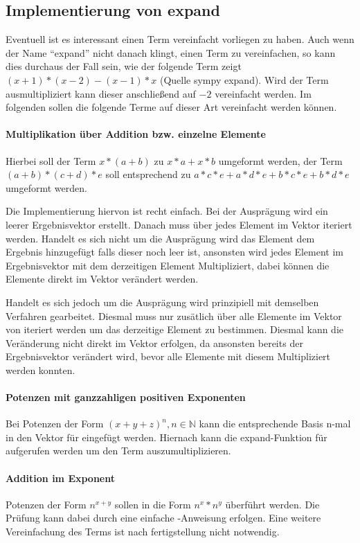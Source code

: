\documentclass[11pt,a4paper, ngerman]{article}
\begin{document}
\subsection{Implementierung von expand}
Eventuell ist es interessant einen Term vereinfacht vorliegen zu haben. Auch wenn der Name ``expand'' nicht danach klingt, einen Term zu vereinfachen, so kann dies durchaus der Fall sein, wie der folgende Term zeigt $(x + 1)*(x - 2) - (x - 1)*x$ (Quelle sympy expand). Wird der Term ausmultipliziert kann dieser anschließend auf $-2$ vereinfacht werden. Im folgenden sollen die folgende Terme auf dieser Art vereinfacht werden können.

\paragraph{Multiplikation über Addition bzw. einzelne Elemente} Hierbei soll der Term $x*(a+b)$ zu $x*a+x*b$ umgeformt werden, der Term $(a+b)*(c+d)*e$ soll entsprechend zu $a*c*e + a*d*e + b*c*e + b*d*e$ umgeformt werden.

Die Implementierung hiervon ist recht einfach. Bei der Ausprägung  wird ein leerer Ergebnisvektor erstellt. Danach muss über jedes Element im Vektor iteriert werden. Handelt es sich nicht um die Ausprägung  wird das Element dem Ergebnis hinzugefügt falls dieser noch leer ist, ansonsten wird jedes Element im Ergebnisvektor mit dem derzeitigen Element Multipliziert, dabei können die Elemente direkt im Vektor verändert werden.

Handelt es sich jedoch um die Ausprägung  wird prinzipiell mit demselben Verfahren gearbeitet. Diesmal muss nur zusätlich über alle Elemente im Vektor von  iteriert werden um das derzeitige Element zu bestimmen. Diesmal kann die Veränderung nicht direkt im Vektor erfolgen, da ansonsten bereits der Ergebnisvektor verändert wird, bevor alle Elemente mit diesem Multipliziert werden konnten.

\paragraph{Potenzen mit ganzzahligen positiven Exponenten} Bei Potenzen der Form $(x+y+z)^n, n \in \mathbb{N}$ kann die entsprechende Basis n-mal in den Vektor für  eingefügt werden. Hiernach kann die expand-Funktion für  aufgerufen werden um den Term auszumultiplizieren. 

\paragraph{Addition im Exponent} Potenzen der Form $n^{x+y}$ sollen in die Form $n^x*n^y$ überführt werden. Die Prüfung kann dabei durch eine einfache -Anweisung erfolgen. Eine weitere Vereinfachung des Terms ist nach fertigstellung nicht notwendig.
\end{document}
